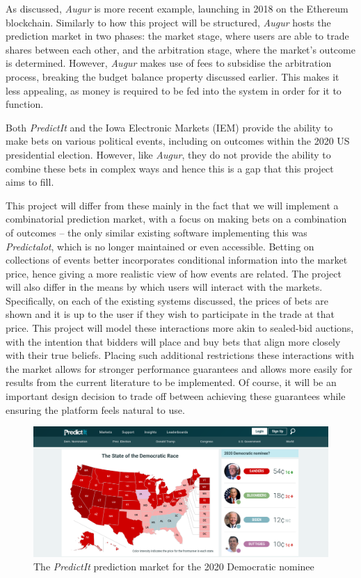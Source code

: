 \documentclass[10pt,a4paper]{article}
\theoremstyle{plain}
\theoremstyle{definition}
\begin{document}
	As discussed, \emph{Augur} is more recent example, launching in 2018 on the
	Ethereum blockchain. Similarly to how this project will be structured,
	\emph{Augur} hosts the prediction market in two phases: the market stage,
	where users are able to trade shares between each other, and the
	arbitration stage, where the market's outcome is determined. However,
	\emph{Augur} makes use of fees to subsidise the arbitration process,
	breaking the budget balance property discussed earlier. This makes it less
	appealing, as money is required to be fed into the system in order for it
	to function.

	Both \emph{PredictIt} \cite{PredictIt} and the Iowa Electronic Markets
	(IEM) \cite{IEM} provide the ability to make bets on various political
	events, including on outcomes within the 2020 US presidential election.
	However, like \emph{Augur}, they do not provide the ability to combine
	these bets in complex ways and hence this is a gap that this project aims
	to fill.

	This project will differ from these mainly in the fact that we will
	implement a combinatorial prediction market, with a focus on making bets on
	a combination of outcomes -- the only similar existing software
	implementing this was \emph{Predictalot}, which is no longer maintained or
	even accessible. Betting on collections of events better incorporates
	conditional information into the market price, hence giving a more
	realistic view of how events are related. The project will also differ in
	the means by which users will interact with the markets. Specifically, on
	each of the existing systems discussed, the prices of bets are shown and it
	is up to the user if they wish to participate in the trade at that price.
	This project will model these interactions more akin to sealed-bid
	auctions, with the intention that bidders will place and buy bets that
	align more closely with their true beliefs. Placing such additional
	restrictions these interactions with the market allows for stronger
	performance guarantees and allows more easily for results from the current
	literature to be implemented. Of course, it will be an important design
	decision to trade off between achieving these guarantees while ensuring the
	platform feels natural to use.

	\begin{figure}[h]
		\centering
		\includegraphics[width=.8\textwidth]{predictit.png}
		\caption{The \emph{PredictIt} prediction market for the 2020 Democratic
		nominee}
		\label{fig:predictit}
	\end{figure}
\end{document}
